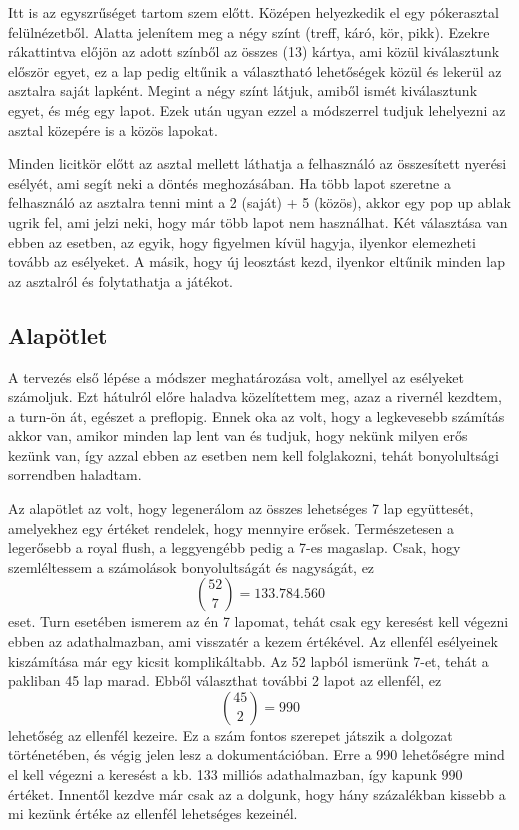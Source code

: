 Itt is az egyszrűséget tartom szem előtt. Középen helyezkedik el egy pókerasztal felülnézetből. Alatta jelenítem meg a négy színt (treff, káró, kör, pikk). Ezekre rákattintva előjön az adott színből az összes (13) kártya, ami közül kiválasztunk először egyet, ez a lap pedig eltűnik a választható lehetőségek közül és lekerül az asztalra saját lapként. Megint a négy színt látjuk, amiből ismét kiválasztunk egyet, és még egy lapot. Ezek után ugyan ezzel a módszerrel tudjuk lehelyezni az asztal közepére is a közös lapokat.

Minden licitkör előtt az asztal mellett láthatja a felhasználó az összesített nyerési esélyét, ami segít neki a döntés meghozásában. Ha több lapot szeretne a felhasználó az asztalra tenni mint a 2 (saját) + 5 (közös), akkor egy pop up ablak ugrik fel, ami jelzi neki, hogy már több lapot nem használhat. Két választása van ebben az esetben, az egyik, hogy figyelmen kívül hagyja, ilyenkor elemezheti tovább az esélyeket. A másik, hogy új leosztást kezd, ilyenkor eltűnik minden lap az asztalról és folytathatja a játékot.

\subsection{Alapötlet} %
A tervezés első lépése a módszer meghatározása volt, amellyel az esélyeket számoljuk. Ezt hátulról előre haladva közelítettem meg, azaz a rivernél kezdtem, a turn-ön át, egészet a preflopig. Ennek oka az volt, hogy a legkevesebb számítás akkor van, amikor minden lap lent van és tudjuk, hogy nekünk milyen erős kezünk van, így azzal ebben az esetben nem kell folglakozni, tehát bonyolultsági sorrendben haladtam.

Az alapötlet az volt, hogy legenerálom az összes lehetséges 7 lap együttesét, amelyekhez egy értéket rendelek, hogy mennyire erősek. Természetesen a legerősebb a royal flush, a leggyengébb pedig a 7-es magaslap. Csak, hogy szemléltessem a számolások bonyolultságát és nagyságát, ez \[ \binom{52}{7}=133.784.560\] eset. Turn esetében ismerem az én 7 lapomat, tehát csak egy keresést kell végezni ebben az adathalmazban, ami visszatér a kezem értékével. Az ellenfél esélyeinek kiszámítása már egy kicsit komplikáltabb. Az 52 lapból ismerünk 7-et, tehát a pakliban 45 lap marad. Ebből választhat további 2 lapot az ellenfél, ez \[ \binom{45}{2}=990\] lehetőség az ellenfél kezeire. Ez a szám fontos szerepet játszik a dolgozat történetében, és végig jelen lesz a dokumentációban. Erre a 990 lehetőségre mind el kell végezni a keresést a kb. 133 milliós adathalmazban, így kapunk 990 értéket. Innentől kezdve már csak az a dolgunk, hogy hány százalékban kissebb a mi kezünk értéke az ellenfél lehetséges kezeinél. 


